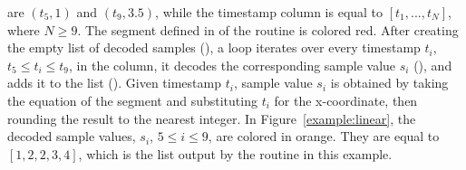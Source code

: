\vspace{-12pt}
\begin{table}[h]
\begin{minipage}{0.45\textwidth}
are $(t_5,1)$ and $(t_9,3.5)$, while the timestamp column is equal to $[t_1,...,t_N]$, where $N \geq 9$. The segment defined in  of the routine is colored red. After creating the empty list of decoded samples (), a loop iterates over every timestamp $t_i$, $t_5 \leq t_i \leq t_9$, in the column, it decodes the corresponding sample value $s_i$ (), and adds it to the list (). Given timestamp $t_i$, sample value $s_i$ is obtained by taking the equation of the segment and substituting $t_i$ for the x-coordinate, then rounding the result to the nearest integer. In Figure~\ref{example:linear}, the decoded sample values, $s_i$, $5 \leq i \leq 9$, are colored in orange. They are equal to $[1, 2, 2, 3, 4]$, which is the list output by the routine \decodeSegment in this example.
\end{minipage}
\hspace{0.02\textwidth}
\begin{minipage}{0.49\textwidth}
\examplelinear
\end{minipage}
\end{table}

